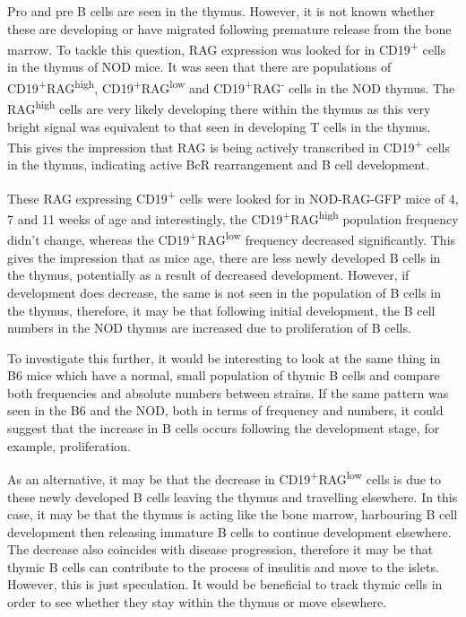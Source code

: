 Pro and pre B cells are seen in the thymus.
However, it is not known whether these are developing or have migrated following premature release from the bone marrow.
To tackle this question, RAG expression was looked for in CD19\textsuperscript{+} cells in the thymus of NOD mice.
It was seen that there are populations of CD19\textsuperscript{+}RAG\textsuperscript{high}, CD19\textsuperscript{+}RAG\textsuperscript{low} and CD19\textsuperscript{+}RAG\textsuperscript{-} cells in the NOD thymus.
The RAG\textsuperscript{high} cells are very likely developing there within the thymus as this very bright signal was equivalent to that seen in developing T cells in the thymus.
This gives the impression that RAG is being actively transcribed in CD19\textsuperscript{+} cells in the thymus, indicating active BcR rearrangement and B cell development.

These RAG expressing CD19\textsuperscript{+} cells were looked for in NOD-RAG-GFP mice of 4, 7 and 11 weeks of age and interestingly, the CD19\textsuperscript{+}RAG\textsuperscript{high} population frequency didn't change, whereas the CD19\textsuperscript{+}RAG\textsuperscript{low} frequency decreased significantly.
This gives the impression that as mice age, there are less newly developed B cells in the thymus, potentially as a result of decreased development.
However, if development does decrease, the same is not seen in the population of B cells in the thymus, therefore, it may be that following initial development, the B cell numbers in the NOD thymus are increased due to proliferation of B cells.

To investigate this further, it would be interesting to look at the same thing in B6 mice which have a normal, small population of thymic B cells and compare both frequencies and absolute numbers between strains.
If the same pattern was seen in the B6 and the NOD, both in terms of frequency and numbers, it could suggest that the increase in B cells occurs following the development stage, for example, proliferation.

As an alternative, it may be that the decrease in CD19\textsuperscript{+}RAG\textsuperscript{low} cells is due to these newly developed B cells leaving the thymus and travelling elsewhere.
In this case, it may be that the thymus is acting like the bone marrow, harbouring B cell development then releasing immature B cells to continue development elsewhere.
The decrease also coincides with disease progression, therefore it may be that thymic B cells can contribute to the process of insulitis and move to the islets.
However, this is just speculation.
It would be beneficial to track thymic cells in order to see whether they stay within the thymus or move elsewhere.

